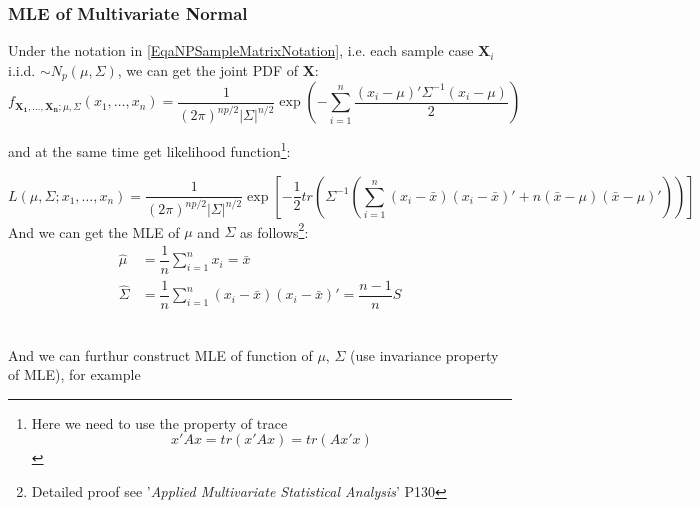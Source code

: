     
    
\subsubsection{MLE of Multivariate Normal}
    Under the notation in \autoref{EqaNPSampleMatrixNotation}, i.e. each sample case $ \mathbf{X}_i$ i.i.d. $\sim N_p(\mu,\Sigma ) $, we can get the joint PDF of $ \mathbf{X} $:
    \begin{equation}
        f_{\mathbf{X_1},\ldots,\mathbf{X_n};\mu,\Sigma }(x_1,\ldots,x_n)=\dfrac{1}{(2\pi)^{np/2}|\Sigma |^{n/2}}\exp\left( -\sum_{i=1}^n\dfrac{(x_i-\mu)'\Sigma ^{-1}(x_i-\mu)}{2} \right) 
    \end{equation}
  
    and at the same time get likelihood function\footnote{Here we need to use the property of trace
    \begin{equation}
        x'Ax=tr(x'Ax)=tr(Ax'x)
    \end{equation}    }:
    
    \begin{equation}
        L(\mu ,\Sigma;x_1,\ldots,x_n)=\dfrac{1}{(2\pi)^{np/2}|\Sigma |^{n/2}}\exp\left[ -\dfrac{1}{2}tr\left( \Sigma ^{-1} \left(\sum_{i=1}^n(x_i-\bar{x})(x_i-\bar{x})'+n(\bar{x}-\mu)(\bar{x}-\mu)' \right) \right) \right]
    \end{equation}
        And we can get the MLE of $ \mu $ and $ \Sigma  $ as follows\footnote{Detailed proof see '\textit{Applied Multivariate Statistical Analysis}' P130}:
        \begin{align}
            \hat{\mu}&= \dfrac{1}{n}\sum_{i=1}^n x_i=\bar{x} \\
            \hat{\Sigma  }&= \dfrac{1}{n}\sum_{i=1}^n(x_i-\bar{x})(x_i-\bar{x})'=\dfrac{n-1}{n}S
        \end{align}

        \\
    
    And we can furthur construct MLE of function of $ \mu,\,\Sigma  $ (use invariance property of MLE), for example 
    
